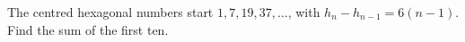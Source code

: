 The centred hexagonal numbers start $1,7,19,37,\ldots$, with $h_n-h_{n-1}=6(n-1)$. Find the sum of the first ten.
